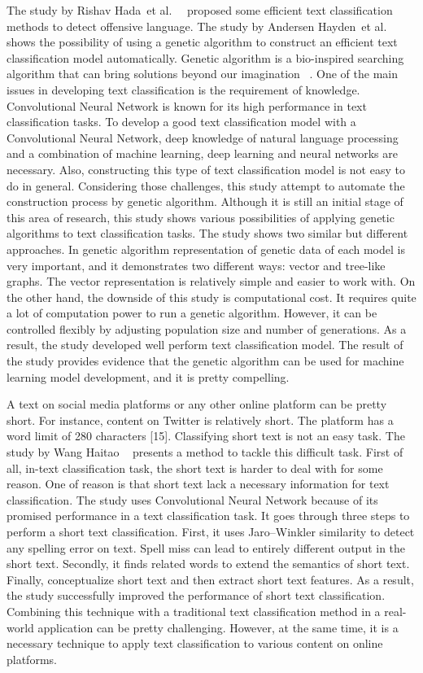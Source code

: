 \documentclass[11pt, natbib=false]{article}
\begin{document}
The study by Rishav Hada et al. ~\cite{hada2021ruddit} proposed some efficient text classification methods to detect offensive language.
The study by Andersen Hayden et al. ~\cite{andersen2021evolving} shows the possibility of using a genetic algorithm to construct an efficient text classification model automatically.
Genetic algorithm is a bio-inspired searching algorithm that can bring solutions beyond our imagination ~\cite{lehman2020surprising}.
One of the main issues in developing text classification is the requirement of knowledge.
Convolutional Neural Network is known for its high performance in text classification tasks. To develop a good text classification model with a Convolutional Neural Network, deep knowledge of natural language processing and a combination of machine learning, deep learning and neural networks are necessary.
Also, constructing this type of text classification model is not easy to do in general. Considering those challenges, this study attempt to automate the construction process by genetic algorithm.
Although it is still an initial stage of this area of research, this study shows various possibilities of applying genetic algorithms to text classification tasks.
The study shows two similar but different approaches. In genetic algorithm representation of genetic data of each model is very important, and it demonstrates two different ways: vector and tree-like graphs.
The vector representation is relatively simple and easier to work with.
On the other hand, the downside of this study is computational cost.
It requires quite a lot of computation power to run a genetic algorithm.
However, it can be controlled flexibly by adjusting population size and number of generations.
As a result, the study developed well perform text classification model.
The result of the study provides evidence that the genetic algorithm can be used for machine learning model development, and it is pretty compelling. 

A text on social media platforms or any other online platform can be pretty short. For instance, content on Twitter is relatively short. The platform has a word limit of 280 characters [15].
Classifying short text is not an easy task.
The study by Wang Haitao ~\cite{wang2021short} presents a method to tackle this difficult task.
First of all, in-text classification task, the short text is harder to deal with for some reason. One of reason is that short text lack a necessary information for text classification.
The study uses Convolutional Neural Network because of its promised performance in a text classification task. It goes through three steps to perform a short text classification.
First, it uses Jaro–Winkler similarity to detect any spelling error on text. Spell miss can lead to entirely different output in the short text.
Secondly, it finds related words to extend the semantics of short text. Finally, conceptualize short text and then extract short text features.
As a result, the study successfully improved the performance of short text classification.
Combining this technique with a traditional text classification method in a real-world application can be pretty challenging.
However, at the same time, it is a necessary technique to apply text classification to various content on online platforms. 
\end{document}
